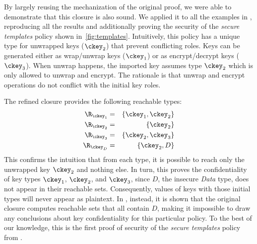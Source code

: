 By largely reusing the mechanization of the original proof, we were able to demonstrate that this closure is also sound.
We applied it to all the examples in \cite{focardi2021secure}, reproducing all the results and additionally proving the security of the \emph{secure templates} policy shown in~\cref{fig:templates}.
Intuitively, this policy has a unique type for unwrapped keys ($\ckey_2$) that prevent conflicting roles.
Keys can be generated either as wrap/unwrap keys ($\ckey_1$) or as encrypt/decrypt keys ($\ckey_3$).
When unwrap happens, the imported key assumes type $\ckey_2$ which is only allowed to unwrap and encrypt. The rationale is that unwrap and encrypt operations do not conflict with the initial key roles.

The refined closure provides the following reachable types:
\begin{eqnarray*}
    \R_{\ckey_1} & = & \{ \ckey_1, \ckey_2 \} \\
    \R_{\ckey_2} & = & \{ \ckey_2 \} \\
    \R_{\ckey_3} & = & \{ \ckey_2, \ckey_3 \} \\
    \R_{\ckey_D} & = & \{ \ckey_2, D \}
\end{eqnarray*}
This confirms the intuition that from each type, it is possible to reach only the unwrapped key $\ckey_2$ and nothing else. In turn, this proves the confidentiality of key types $\ckey_1$, $\ckey_2$, and $\ckey_3$, since $D$, the insecure \emph{Data} type, does not appear in their reachable sets. Consequently, values of keys with those initial types will never appear as plaintext. In \cite{focardi2021secure}, instead, it is shown that the original closure computes reachable sets that all contain $D$, making it impossible to draw any conclusions about key confidentiality for this particular policy.
To the best of our knowledge, this is the first proof of security of the \emph{secure templates} policy from \cite{BCFS-ccs10}.

